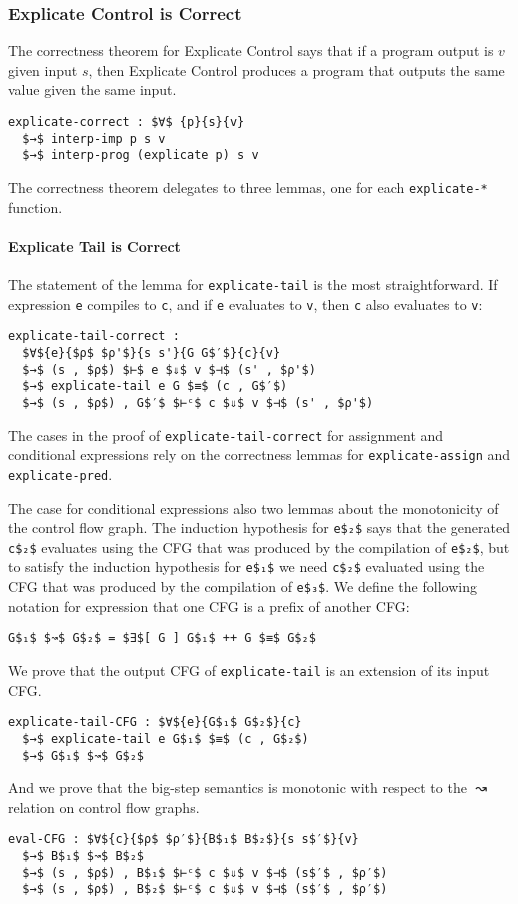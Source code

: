 \documentclass[sigplan,review,dvipsnames,screen,10pt]{acmart}
\begin{document}
\subsubsection{Explicate Control is Correct}

The correctness theorem for Explicate Control says that if a program
output is $v$ given input $s$, then Explicate Control produces a
program that outputs the same value given the same input.

\begin{lstlisting}
explicate-correct : $∀$ {p}{s}{v}
  $→$ interp-imp p s v
  $→$ interp-prog (explicate p) s v
\end{lstlisting}

The correctness theorem delegates to three lemmas, one for each
\lstinline{explicate-*} function.

\paragraph{Explicate Tail is Correct}

The statement of the lemma for \lstinline{explicate-tail} is the most
straightforward. If expression \lstinline{e} compiles to
\lstinline{c}, and if \lstinline{e} evaluates to \lstinline{v}, then
\lstinline{c} also evaluates to \lstinline{v}:
\begin{lstlisting}
explicate-tail-correct :
  $∀${e}{$ρ$ $ρ'$}{s s'}{G G$′$}{c}{v}
  $→$ (s , $ρ$) $⊢$ e $⇓$ v $⊣$ (s' , $ρ'$)
  $→$ explicate-tail e G $≡$ (c , G$′$)
  $→$ (s , $ρ$) , G$′$ $⊢ᶜ$ c $⇓$ v $⊣$ (s' , $ρ'$)
\end{lstlisting}
\noindent The cases in the proof of \lstinline{explicate-tail-correct}
for assignment and conditional expressions rely on the correctness
lemmas for \lstinline{explicate-assign} and
\lstinline{explicate-pred}.

The case for conditional expressions also two lemmas about the
monotonicity of the control flow graph.  The induction hypothesis for
\lstinline{e$₂$} says that the generated \lstinline{c$₂$} evaluates
using the CFG that was produced by the compilation of
\lstinline{e$₂$}, but to satisfy the induction hypothesis
for \lstinline{e$₁$} we need \lstinline{c$₂$} evaluated using the CFG
that was produced by the compilation of \lstinline{e$₃$}.
We define the following notation for
expression that one CFG is a prefix of another CFG:
\begin{lstlisting}
G$₁$ $↝$ G$₂$ = $∃$[ G ] G$₁$ ++ G $≡$ G$₂$
\end{lstlisting}
\noindent We prove that the output CFG of \lstinline{explicate-tail} is
an extension of its input CFG.
\begin{lstlisting}
explicate-tail-CFG : $∀${e}{G$₁$ G$₂$}{c}
  $→$ explicate-tail e G$₁$ $≡$ (c , G$₂$)
  $→$ G$₁$ $↝$ G$₂$
\end{lstlisting}
\noindent And we prove that the big-step semantics is monotonic with
respect to the $↝$ relation on control flow graphs.
\begin{lstlisting}
eval-CFG : $∀${c}{$ρ$ $ρ′$}{B$₁$ B$₂$}{s s$′$}{v}
  $→$ B$₁$ $↝$ B$₂$
  $→$ (s , $ρ$) , B$₁$ $⊢ᶜ$ c $⇓$ v $⊣$ (s$′$ , $ρ′$)
  $→$ (s , $ρ$) , B$₂$ $⊢ᶜ$ c $⇓$ v $⊣$ (s$′$ , $ρ′$)
\end{lstlisting}
\end{document}
